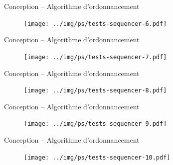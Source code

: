 \documentclass[frenchb]{beamer}
\begin{document}
\begin{frame}{Conception -- Algorithme d’ordonnancement}
    \begin{figure}
        \texttt{[image: ../img/ps/tests-sequencer-6.pdf]}
    \end{figure}
\end{frame}

\begin{frame}{Conception -- Algorithme d’ordonnancement}
    \begin{figure}
        \texttt{[image: ../img/ps/tests-sequencer-7.pdf]}
    \end{figure}
\end{frame}

\begin{frame}{Conception -- Algorithme d’ordonnancement}
    \begin{figure}
        \texttt{[image: ../img/ps/tests-sequencer-8.pdf]}
    \end{figure}
\end{frame}

\begin{frame}{Conception -- Algorithme d’ordonnancement}
    \begin{figure}
        \texttt{[image: ../img/ps/tests-sequencer-9.pdf]}
    \end{figure}
\end{frame}

\begin{frame}{Conception -- Algorithme d’ordonnancement}
    \begin{figure}
        \texttt{[image: ../img/ps/tests-sequencer-10.pdf]}
    \end{figure}
\end{frame}
\end{document}
